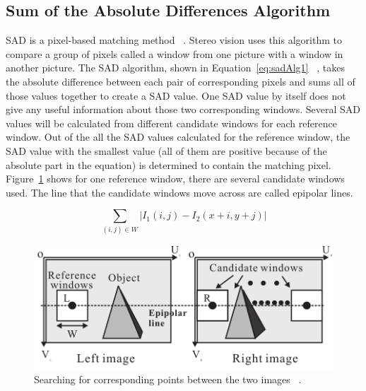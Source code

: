 \subsection{Sum of the Absolute Differences Algorithm}

SAD is a pixel-based matching method ~\cite{alteraStratixIVPaper}. Stereo vision uses this algorithm to compare a group of pixels called a window from one picture with a window in another picture. The SAD algorithm, shown in Equation~\ref{eq:sadAlg1} ~\cite{alteraStratixIVPaper}, takes the absolute difference between each pair of corresponding pixels and sums all of those values together to create a SAD value. One SAD value by itself does not give any useful information about those two corresponding windows. Several SAD values will be calculated from different candidate windows for each reference window. Out of the all the SAD values calculated for the reference window, the SAD value with the smallest value (all of them are positive because of the absolute part in the equation) is determined to contain the matching pixel. Figure~\ref{fig:sad_corr} shows for one reference window, there are several candidate windows used. The line that the candidate windows move across are called epipolar lines. 

\begin{equation}
	\sum\limits_{(i,j)\in W}\left| I_{1}(i,j)-I_{2}(x+i,y+j) \right|
	\label{eq:sadAlg1}
\end{equation}

\begin{figure}
\begin{center}
	\includegraphics{figures/sadCorrespondingWindows.png}
	\captionfonts
	\caption{Searching for corresponding points between the two images ~\cite{sadParallel}.}
	\label{fig:sad_corr}
\end{center}
\end{figure}

